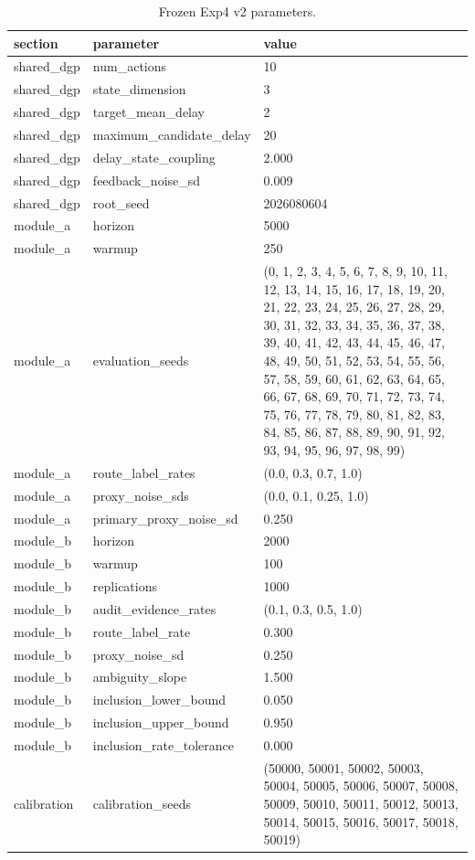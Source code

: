 \begin{table}[t]
\caption{Frozen Exp4 v2 parameters.}
\label{tab:tbl_app_exp4_parameters}
\begin{tabular}{lll}
\toprule
section & parameter & value \\
\midrule
shared_dgp & num_actions & 10 \\
shared_dgp & state_dimension & 3 \\
shared_dgp & target_mean_delay & 2 \\
shared_dgp & maximum_candidate_delay & 20 \\
shared_dgp & delay_state_coupling & 2.000 \\
shared_dgp & feedback_noise_sd & 0.009 \\
shared_dgp & root_seed & 2026080604 \\
module_a & horizon & 5000 \\
module_a & warmup & 250 \\
module_a & evaluation_seeds & (0, 1, 2, 3, 4, 5, 6, 7, 8, 9, 10, 11, 12, 13, 14, 15, 16, 17, 18, 19, 20, 21, 22, 23, 24, 25, 26, 27, 28, 29, 30, 31, 32, 33, 34, 35, 36, 37, 38, 39, 40, 41, 42, 43, 44, 45, 46, 47, 48, 49, 50, 51, 52, 53, 54, 55, 56, 57, 58, 59, 60, 61, 62, 63, 64, 65, 66, 67, 68, 69, 70, 71, 72, 73, 74, 75, 76, 77, 78, 79, 80, 81, 82, 83, 84, 85, 86, 87, 88, 89, 90, 91, 92, 93, 94, 95, 96, 97, 98, 99) \\
module_a & route_label_rates & (0.0, 0.3, 0.7, 1.0) \\
module_a & proxy_noise_sds & (0.0, 0.1, 0.25, 1.0) \\
module_a & primary_proxy_noise_sd & 0.250 \\
module_b & horizon & 2000 \\
module_b & warmup & 100 \\
module_b & replications & 1000 \\
module_b & audit_evidence_rates & (0.1, 0.3, 0.5, 1.0) \\
module_b & route_label_rate & 0.300 \\
module_b & proxy_noise_sd & 0.250 \\
module_b & ambiguity_slope & 1.500 \\
module_b & inclusion_lower_bound & 0.050 \\
module_b & inclusion_upper_bound & 0.950 \\
module_b & inclusion_rate_tolerance & 0.000 \\
calibration & calibration_seeds & (50000, 50001, 50002, 50003, 50004, 50005, 50006, 50007, 50008, 50009, 50010, 50011, 50012, 50013, 50014, 50015, 50016, 50017, 50018, 50019) \\

\end{tabular}
\end{table}
